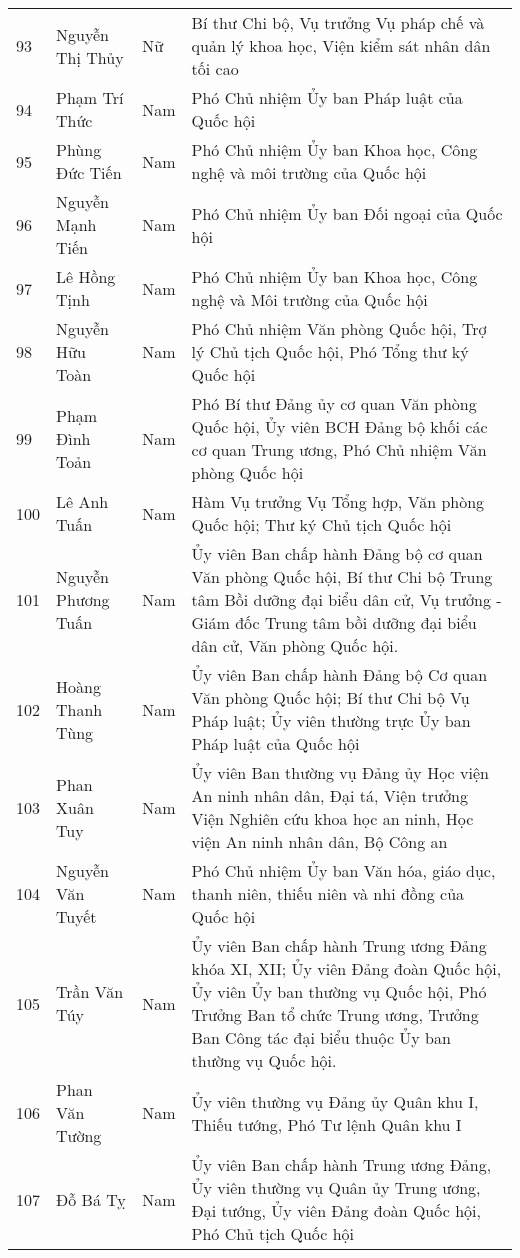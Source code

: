 \begin{longtable}{p{}p{}p{}p{}}
93 &
  Nguyễn Thị Thủy &
  Nữ &
  Bí thư Chi bộ, Vụ trưởng Vụ pháp chế và quản lý khoa học, Viện kiểm sát nhân dân tối cao \\
94 &
  Phạm Trí Thức &
  Nam &
  Phó Chủ nhiệm Ủy ban Pháp luật của Quốc hội \\
95 &
  Phùng Đức Tiến &
  Nam &
  Phó Chủ nhiệm Ủy ban Khoa học, Công nghệ và môi trường của Quốc hội \\
96 &
  Nguyễn Mạnh Tiến &
  Nam &
  Phó Chủ nhiệm Ủy ban Đối ngoại của Quốc hội \\
97 &
  Lê Hồng Tịnh &
  Nam &
  Phó Chủ nhiệm Ủy ban Khoa học, Công nghệ và Môi trường của Quốc hội \\
98 &
  Nguyễn Hữu Toàn &
  Nam &
  Phó Chủ nhiệm Văn phòng Quốc hội, Trợ lý Chủ tịch Quốc hội, Phó Tổng thư ký Quốc hội \\
99 &
  Phạm Đình Toản &
  Nam &
  Phó Bí thư Đảng ủy cơ quan Văn phòng Quốc hội, Ủy viên BCH Đảng bộ khối các cơ quan Trung ương, Phó Chủ nhiệm Văn phòng Quốc hội \\
100 &
  Lê Anh Tuấn &
  Nam &
  Hàm Vụ trưởng Vụ Tổng hợp, Văn phòng Quốc hội; Thư ký Chủ tịch Quốc hội \\
101 &
  Nguyễn Phương Tuấn &
  Nam &
  Ủy viên Ban chấp hành Đảng bộ cơ quan Văn phòng Quốc hội, Bí thư Chi bộ Trung tâm Bồi dưỡng đại biểu dân cử, Vụ trưởng - Giám đốc Trung tâm bồi dưỡng đại biểu dân cử, Văn phòng Quốc hội. \\
102 &
  Hoàng Thanh Tùng &
  Nam &
  Ủy viên Ban chấp hành Đảng bộ Cơ quan Văn phòng Quốc hội; Bí thư Chi bộ Vụ Pháp luật; Ủy viên thường trực Ủy ban Pháp luật của Quốc hội \\
103 &
  Phan Xuân Tuy &
  Nam &
  Ủy viên Ban thường vụ Đảng ủy Học viện An ninh nhân dân, Đại tá, Viện trưởng Viện Nghiên cứu khoa học an ninh, Học viện An ninh nhân dân, Bộ Công an \\
104 &
  Nguyễn Văn Tuyết &
  Nam &
  Phó Chủ nhiệm Ủy ban Văn hóa, giáo dục, thanh niên, thiếu niên và nhi đồng của Quốc hội \\
105 &
  Trần Văn Túy &
  Nam &
  Ủy viên Ban chấp hành Trung ương Đảng khóa XI, XII; Ủy viên Đảng đoàn Quốc hội, Ủy viên Ủy ban thường vụ Quốc hội, Phó Trưởng Ban tổ chức Trung ương, Trưởng Ban Công tác đại biểu thuộc Ủy ban thường vụ Quốc hội. \\
106 &
  Phan Văn Tường &
  Nam &
  Ủy viên thường vụ Đảng ủy Quân khu I, Thiếu tướng, Phó Tư lệnh Quân khu I \\
107 &
  Đỗ Bá Tỵ &
  Nam &
  Ủy viên Ban chấp hành Trung ương Đảng, Ủy viên thường vụ Quân ủy Trung ương, Đại tướng, Ủy viên Đảng đoàn Quốc hội, Phó Chủ tịch Quốc hội \\

\end{longtable}
